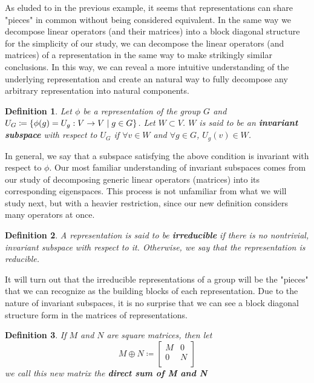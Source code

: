 \documentclass[10pt]{ucthesis}
\newtheorem{definition}{Definition}[chapter]
\begin{document}
As eluded to in the previous example, it seems that representations can share "pieces" in common without being considered equivalent. In the same way we decompose linear operators (and their matrices) into a block diagonal structure for the simplicity of our study, we can decompose the linear operators (and matrices) of a representation in the same way to make strikingly similar conclusions. In this way, we can reveal a more intuitive understanding of the underlying representation and create an natural way to fully decompose any arbitrary representation into natural components. 

\begin{definition}
	Let $\phi$ be a representation of the group $G$ and $U_G \coloneq \{\phi(g)=U_g: V\rightarrow V \hspace{1mm}| \hspace{1mm} g\in G\}$. Let $W \subset V$. $W$ is said to be an \textbf{invariant subspace} with respect to $U_G$ if $\forall v \in W$ and $\forall g \in G$, $U_g(v)\in W$.
\end{definition}

In general, we say that a subspace satisfying the above condition is invariant with respect to $\phi$. Our most familiar understanding of invariant subspaces comes from our study of decomposing generic linear operators (matrices) into its corresponding eigenspaces. This process is not unfamiliar from what we will study next, but with a heavier restriction, since our new definition considers many operators at once.

\begin{definition}
	A representation is said to be \textbf{irreducible} if there is no nontrivial, invariant subspace with respect to it. Otherwise, we say that the representation is reducible.
\end{definition}

It will turn out that the irreducible representations of a group will be the "pieces" that we can recognize as the building blocks of each representation. Due to the nature of invariant subspaces, it is no surprise that we can see a block diagonal structure form in the matrices of representations.

\begin{definition}
	If $M$ and $N$ are square matrices, then let $$M\oplus N \coloneq \begin{bmatrix}
																			M & 0\\
																			0 & N\\
																		\end{bmatrix}$$
	we call this new matrix the \textbf{direct sum of M and N}
\end{definition}
\end{document}
